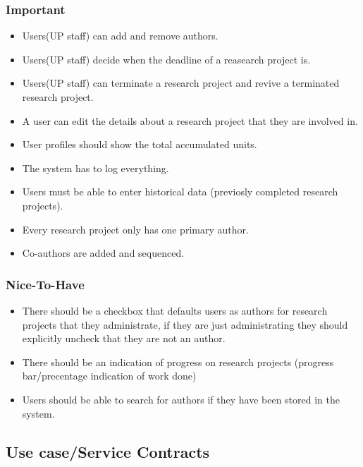 \documentclass[a4paper,12pt]{report}
\begin{document}
\subsubsection{Important}
	\begin{itemize}
		\item Users(UP staff) can add and remove authors.
		\item Users(UP staff) decide when the deadline of a reasearch project is.
		\item Users(UP staff) can terminate a research project and revive a terminated research project.
		\item A user can edit the details about a research project that they are involved in.
		\item User profiles should show the total accumulated units.
		\item The system has to log everything.
		\item Users must be able to enter historical data (previosly completed research projects).
		\item Every research project only has one primary author.
		\item Co-authors are added and sequenced.
	\end{itemize}

\subsubsection{Nice-To-Have}
	\begin{itemize}
		\item There should be a checkbox that defaults users as authors for research projects that they administrate, if they are just administrating they should explicitly uncheck that they are not an author.
		\item There should be an indication of progress on research projects (progress bar/precentage indication of work done)
		\item Users should be able to search for authors if they have been stored in the system.
	\end{itemize}

\subsection{Use case/Service Contracts}
\end{document}
